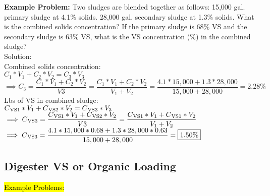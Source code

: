 \textbf{Example Problem:}  Two sludges are blended together as follows: 15,000 gal. primary sludge at 4.1\% solids. 28,000 gal. secondary sludge at 1.3\% solids. What is the combined solids concentration?  If the primary sludge is 68\% VS and the secondary sludge is 63\% VS, what is the VS concentration (\%) in the combined sludge?\\
\vspace{0.2cm}
Solution:\\
\vspace{0.2cm}
Combined solids concentration:\\
\vspace{0.2cm}
$
C_1*V_1 + C_2*V_2 = C_3*V_3$\\
\vspace{0.2cm}
$\implies C_3 = \dfrac{C_1*V_1 + C_2*V_2}{V3}=\dfrac{C_1*V_1 + C_2*V_2}{V_1 + V_2}=\dfrac{4.1*15,000 + 1.3*28,000}{15,000 + 28,000}=\boxed{2.28\%}
$\\
\vspace{0.2cm}
Lbs of VS in combined sludge:\\
\vspace{0.2cm}
$
C\textsubscript{VS1}*V_1 + C\textsubscript{VS2}*V_2 = C\textsubscript{VS3}*V_3$\\
\vspace{0.2cm}
$\implies C\textsubscript{VS3} = \dfrac{C\textsubscript{VS1}*V_1 + C\textsubscript{VS2}*V_2}{V3}=\dfrac{C\textsubscript{VS1}*V_1 + C\textsubscript{VS1}*V_2}{V_1 + V_2}$\\
\vspace{0.2cm}
$\implies C\textsubscript{VS3}
=\dfrac{4.1*15,000*0.68 + 1.3*28,000*0.63}{15,000 + 28,000}=\boxed{1.50\%}$
\\

\vspace{0.3cm}













				
				
\subsection{Digester VS or Organic Loading}				
				\hl{Example Problems:}\\

